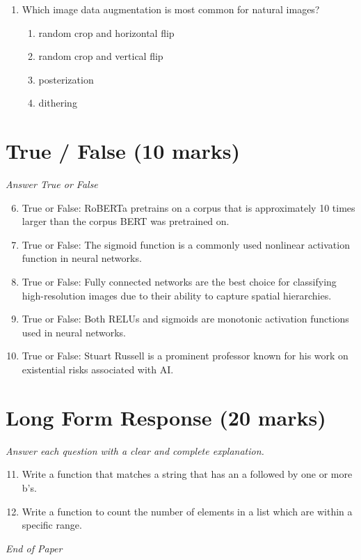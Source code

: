 \documentclass[12pt]{article}
\begin{document}
\begin{enumerate}[label=\arabic*.]
\begin{enumerate}[label=(\alph*)]
    \item It is used for prediction.
    \item It may be used for interpretation.
    \item It discovers causal relationships
\end{enumerate}
\item Which image data augmentation is most common for natural images?
\begin{enumerate}[label=(\alph*)]
    \item random crop and horizontal flip
    \item random crop and vertical flip
    \item posterization
    \item dithering
\end{enumerate}
\end{enumerate}

\section*{True / False (10 marks)}
\textit{Answer True or False}
\begin{enumerate}[label=\arabic*.]
\setcounter{enumi}{5}
\item True or False: RoBERTa pretrains on a corpus that is approximately 10 times larger than the corpus BERT was pretrained on.
\item True or False: The sigmoid function is a commonly used nonlinear activation function in neural networks.
\item True or False: Fully connected networks are the best choice for classifying high-resolution images due to their ability to capture spatial hierarchies.
\item True or False: Both RELUs and sigmoids are monotonic activation functions used in neural networks.
\item True or False: Stuart Russell is a prominent professor known for his work on existential risks associated with AI.
\end{enumerate}

\section*{Long Form Response (20 marks)}
\textit{Answer each question with a clear and complete explanation.}
\begin{enumerate}[label=\arabic*.]
\setcounter{enumi}{10}
\item Write a function that matches a string that has an a followed by one or more b's.
\item Write a function to count the number of elements in a list which are within a specific range.
\end{enumerate}

\vfill
\noindent\textit{End of Paper}
\end{document}
